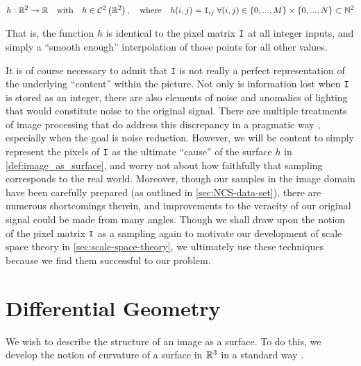\begin{defn} \label{def:image_as_surface}
 \begin{equation*}
 h: \mathbb{R}^2 \to \mathbb{R}
 \quad \textrm{with}\quad
 h \in \mathcal{C}^2\left(\mathbb{R}^2\right),
 \quad\textrm{where}\quad
    h(i,j) = \mathtt{I}_{ij}
    \; \forall (i,j) \in
     \left\{0,...,M\right\} \times
     \left\{0,...,N\right\} \subset \mathbb{N}^2
    \end{equation*}
\end{defn}
That is, the function $h$ is identical to the pixel matrix $\mathtt{I}$ at all integer inputs,
and simply a ``smooth enough'' interpolation of those points for all other values.


It is of course necessary to admit that $\mathtt{I}$ is not really a perfect representation of the underlying ``content'' within the picture. Not only is information lost when $\mathtt{I}$ is stored as an integer, there are also elements of noise and anomalies of lighting that would constitute noise to the original signal. There are multiple treatments of image processing that do address this discrepancy in a pragmatic way \cite{DIPGW}, especially when the goal is noise reduction.
However, we will be content to simply represent the pixels of $\mathtt{I}$ as the ultimate ``cause'' of the surface $h$ in \cref{def:image_as_surface}, and worry not about how faithfully that sampling corresponds to the real world.
Moreover, though our samples in the image domain have been carefully prepared (as outlined in \cref{sec:NCS-data-set}), there are numerous shortcomings therein, and improvements to the veracity of our original signal could be made from many angles.
Though we shall draw upon the notion of the pixel matrix $\mathtt{I}$ as a sampling again to motivate our development of scale space theory in \cref{sec:scale-space-theory}, we ultimately use these techniques because we find them successful to our problem.
 
\section{Differential Geometry} \label{sec:differential-geometry}
  
We wish to describe the structure of an image as a surface. To do this, we develop the notion of curvature of a surface in $\mathbb{R}^3$ in a standard way \cite{Kuhnel-DiffGeo}.

